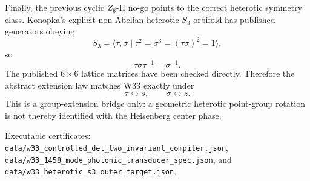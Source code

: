 Finally, the previous cyclic \(Z_6\)-II no-go points to the correct heterotic
symmetry class.  Konopka's explicit non-Abelian heterotic \(S_3\) orbifold has
published generators obeying
\[
S_3=\langle\tau,\sigma\mid\tau^2=\sigma^3=(\tau\sigma)^2=1\rangle,
\]
so
\[
\tau\sigma\tau^{-1}=\sigma^{-1}.
\]
The published \(6\times6\) lattice matrices have been checked directly.
Therefore the abstract extension law matches W33 exactly under
\[
\tau\leftrightarrow s,\qquad \sigma\leftrightarrow z.
\]
This is a group-extension bridge only: a geometric heterotic point-group
rotation is not thereby identified with the Heisenberg center phase.

Executable certificates:
\texttt{data/w33\_controlled\_det\_two\_invariant\_compiler.json},
\texttt{data/w33\_1458\_mode\_photonic\_transducer\_spec.json}, and
\texttt{data/w33\_heterotic\_s3\_outer\_target.json}.
